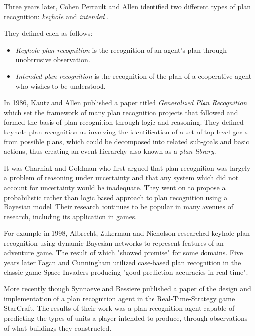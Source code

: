\documentclass[parskip]{cs4rep}
\begin{document}
Three years later, Cohen Perrault and Allen identified two different types of plan recognition: \textit{keyhole} and \textit{intended} \cite{Cohen82a}. 

They defined each as follows:

\begin{itemize}
\item
\textit{Keyhole plan recognition} is the recognition of an agent's plan through unobtrusive observation.
\item
\textit{Intended plan recognition} is the recognition of the plan of a cooperative agent who wishes to be understood.
\end{itemize}

In 1986, Kautz and Allen published a paper titled \textit{Generalized Plan Recognition} \cite{conf/aaai/KautzA86} which set the framework of many plan recognition projects that followed and formed the basis of plan recognition through logic and reasoning. They defined keyhole plan recognition as involving the identification of a set of top-level goals from possible plans, which could be decomposed into related sub-goals and basic actions, thus creating an event hierarchy also known as a \textit{plan library}. 

It was Charniak and Goldman \cite{journals/ai/CharniakG93} who first argued that plan recognition was largely a problem of reasoning under uncertainty and that any system which did not account for uncertainty would be inadequate. They went on to propose a probabilistic rather than logic based approach to plan recognition using a Bayesian model. Their research continues to be popular in many avenues of research, including its application in games.

For example in 1998, Albrecht, Zukerman and Nicholson \cite{Albrecht:1998:BMK:598277.598308} researched keyhole plan recognition using dynamic Bayesian networks to represent features of an adventure game. The result of which "showed promise" for some domains. Five years later Fagan and Cunningham utilized case-based plan recognition in the classic game Space Invaders \cite{Fagan03case-basedplan} producing "good prediction accuracies in real time".

More recently though Synnaeve and Bessiere \cite{conf/aiide/SynnaeveB11} published a paper of the design and implementation of a plan recognition agent in the Real-Time-Strategy game StarCraft. The results of their work was a plan recognition agent capable of predicting the types of units a player intended to produce, through observations of what buildings they constructed.
\end{document}
